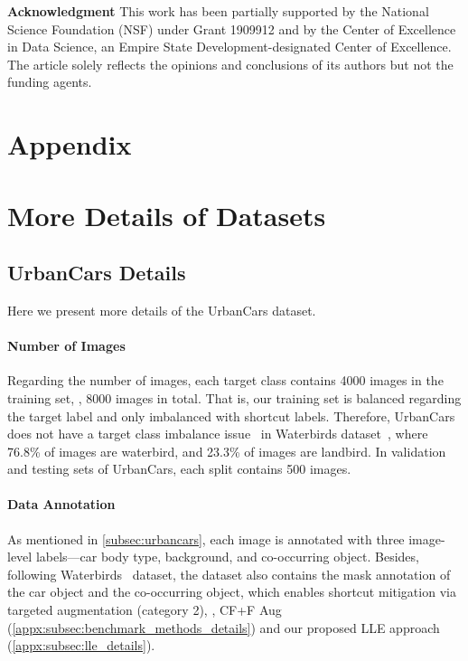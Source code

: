 \documentclass[10pt,twocolumn,letterpaper]{article}
\begin{document}
\vspace{5pt}
\noindent \textbf{Acknowledgment} \quad This work has been partially supported by the National Science Foundation (NSF) under Grant 1909912 and by the Center of Excellence in Data Science, an Empire State Development-designated Center of Excellence. The article solely reflects the opinions and conclusions of its authors but not the funding agents.


\clearpage
\nocite{FlaticonWhack} 

\balance
{\small


}


\clearpage

\onecolumn

\appendix


\section*{Appendix}



\section{More Details of Datasets}

\subsection{UrbanCars Details}
\label{appx:subsec:urbancars_details}

Here we present more details of the UrbanCars dataset.

\paragraph{Number of Images}
Regarding the number of images, each target class contains 4000 images in the training set, \ie, 8000 images in total. That is, our training set is balanced regarding the target label and only imbalanced with shortcut labels.
Therefore, UrbanCars does not have a target class imbalance issue~\cite{idrissi2022Conf.CausalLearn.Reason.Simple} in Waterbirds dataset~\cite{sagawa2020Int.Conf.Learn.Represent.Distributionally}, where 76.8\% of images are waterbird, and 23.3\% of images are landbird.
In validation and testing sets of UrbanCars, each split contains 500 images.


\paragraph{Data Annotation} As mentioned in \cref{subsec:urbancars}, each image is annotated with three image-level labels---car body type, background, and co-occurring object. Besides, following Waterbirds~\cite{sagawa2020Int.Conf.Learn.Represent.Distributionally} dataset, the dataset also contains the mask annotation of the car object and the co-occurring object, which enables shortcut mitigation via targeted augmentation (category 2), \ie, CF+F Aug~\cite{chang2021IEEECVFConf.Comput.Vis.PatternRecognit.CVPRRobust} (\cf \cref{appx:subsec:benchmark_methods_details}) and our proposed LLE approach (\cf \cref{appx:subsec:lle_details}).
\end{document}
